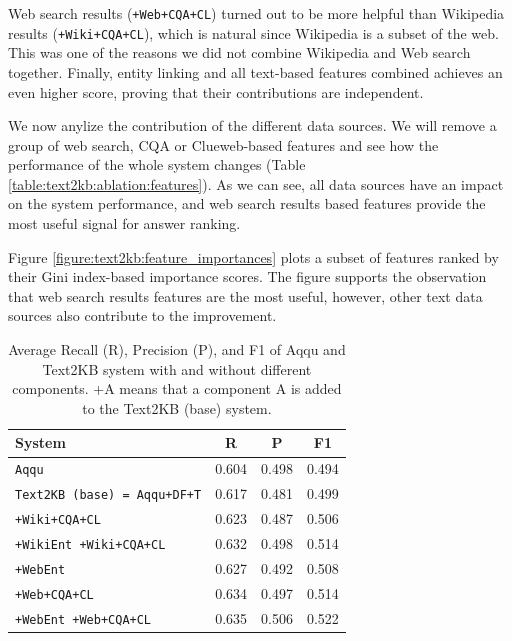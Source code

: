 Web search results (\texttt{+Web+CQA+CL}) turned out to be more helpful than Wikipedia results (\texttt{+Wiki+CQA+CL}), which is natural since Wikipedia is a subset of the web.
This was one of the reasons we did not combine Wikipedia and Web search together.
Finally, entity linking and all text-based features combined achieves an even higher score, proving that their contributions are independent.

We now anylize the contribution of the different data sources.
We will remove a group of web search, CQA or Clueweb-based features and see how the performance of the whole system changes (Table \ref{table:text2kb:ablation:features}).
As we can see, all data sources have an impact on the system performance, and web search results based features provide the most useful signal for answer ranking.

Figure \ref{figure:text2kb:feature_importances} plots a subset of features ranked by their Gini index-based importance scores.
The figure supports the observation that web search results features are the most useful, however, other text data sources also contribute to the improvement.

\begin{table}[h]
\centering
\begin{tabular}{| p{6cm} | c | c | c | }
\hline
System & R & P & F1 \\
\hline
\texttt{Aqqu} & 0.604 & 0.498 & 0.494\\
\texttt{Text2KB (base) = Aqqu+DF+T} & 0.617 & 0.481 & 0.499 \\
\hline
\texttt{+Wiki+CQA+CL} & 0.623 & 0.487 & 0.506 \\
\texttt{+WikiEnt +Wiki+CQA+CL} & 0.632 & 0.498 & 0.514 \\
\hline
\texttt{+WebEnt} & 0.627 & 0.492 & 0.508 \\
\texttt{+Web+CQA+CL} & 0.634 & 0.497 & 0.514 \\
\texttt{+WebEnt +Web+CQA+CL} & 0.635 & 0.506 & 0.522 \\
\hline
\end{tabular}
\caption{Average Recall (R), Precision (P), and F1 of Aqqu and Text2KB system with and without different components. +A means that a component A is added to the Text2KB (base) system.}
\label{table:text2kb:ablation:entities_vs_features}
\end{table}

